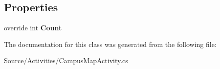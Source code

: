 \subsection*{Properties}
\begin{DoxyCompactItemize}
\item 
override int {\bfseries Count}\hypertarget{class_w_c_c_mobile_1_1_drawer_menu_adapter_afe4d6b612f857db6cfa993d46c7bd449}{}\label{class_w_c_c_mobile_1_1_drawer_menu_adapter_afe4d6b612f857db6cfa993d46c7bd449}

\end{DoxyCompactItemize}


The documentation for this class was generated from the following file\+:\begin{DoxyCompactItemize}
\item 
Source/\+Activities/Campus\+Map\+Activity.\+cs\end{DoxyCompactItemize}

